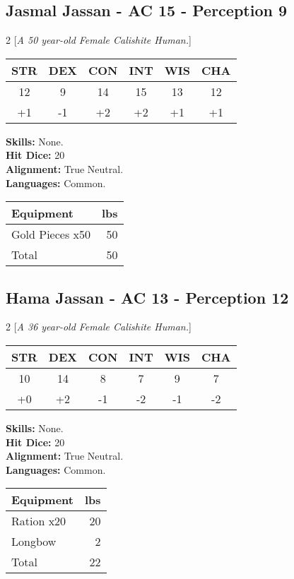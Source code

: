 \subsection*{Jasmal Jassan - AC 15 - Perception 9}
\begin{multicols}{2}
[\textit{A 50 year-old Female Calishite Human.}]
\begin{tabular}{cccccc}
 {STR}&
 {DEX}&
 {CON}&
 {INT}&
 {WIS}&
 {CHA}\\
\hline
12 & 9 & 14 & 15 & 13 & 12\\
+1 & -1 & +2 & +2 & +1 & +1
\end{tabular}
\textbf{Skills:} 
None.\\
\textbf{Hit Dice:} 20\\
\textbf{Alignment:} True Neutral.\\
\textbf{Languages:} 
Common.\\

\begin{tabular}{p{} r}
\textbf{Equipment} & lbs\\
\hline

Gold Pieces x50 & 50\\

\hline
Total & 50
\end{tabular}


\end{multicols}


\subsection*{Hama Jassan - AC 13 - Perception 12}
\begin{multicols}{2}
[\textit{A 36 year-old Female Calishite Human.}]
\begin{tabular}{cccccc}
 {STR}&
 {DEX}&
 {CON}&
 {INT}&
 {WIS}&
 {CHA}\\
\hline
10 & 14 & 8 & 7 & 9 & 7\\
+0 & +2 & -1 & -2 & -1 & -2
\end{tabular}
\textbf{Skills:} 
None.\\
\textbf{Hit Dice:} 20\\
\textbf{Alignment:} True Neutral.\\
\textbf{Languages:} 
Common.\\

\begin{tabular}{p{} r}
\textbf{Equipment} & lbs\\
\hline

Ration x20 & 20\\

Longbow & 2\\

\hline
Total & 22
\end{tabular}


\end{multicols}
